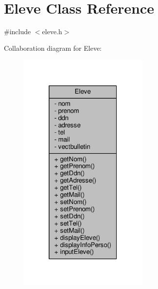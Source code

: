 \hypertarget{class_eleve}{\section{Eleve Class Reference}
\label{class_eleve}
}


{\ttfamily \#include $<$eleve.\+h$>$}



Collaboration diagram for Eleve\+:\nopagebreak
\begin{figure}[H]
\begin{center}
\leavevmode
\includegraphics[width=184pt]{class_eleve__coll__graph}
\end{center}
\end{figure}
